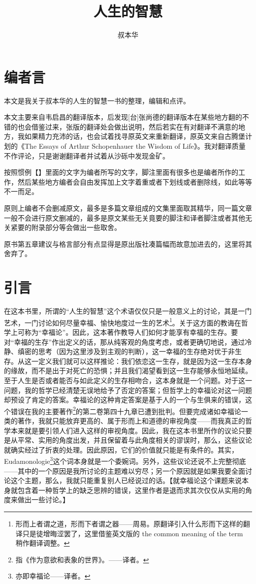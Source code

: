 \documentclass[12pt,oneside]{book}
\title{人生的智慧}
\author{叔本华}
\begin{document}



\frontmatter 
{}
\chapter*{编者言}
本文是我关于叔本华的人生的智慧一书的整理，编辑和点评。

本文主要来自韦启昌的翻译版本，后发现[台]张尚德的翻译版本在某些地方翻的不错的也会借鉴过来，张版的翻译处会做出说明，然后若实在有对翻译不满意的地方，我如果精力充沛的话，也会试着找寻原英文来重新翻译，原英文来自古腾堡计划的《The Essays of Arthur Schopenhauer the Wisdom of Life》。我对翻译质量不作评论，只是谢谢翻译者并试着从沙砾中发现金矿。

按照惯例【】里面的文字为编者所写的文字，脚注里面有很多也是编者所作的工作，然后某些地方编者会自由发挥加上文字着重或者下划线或者删除线，如此等等不一而足。 

原则上编者不会删减原文，最多是多篇文章组成的文集里面取其精华，同一篇文章一般不会进行原文删减的，最多是原文某些无关竟要的脚注和译者脚注或者其他无关紧要的附录部分等会做出一些取舍。

原书第五章建议与格言部分有点显得是原出版社凑篇幅而故意加进去的，这里将其舍弃了。

\chapter*{引言}
在这本书里，所谓的“人生的智慧”这个术语仅仅只是一般意义上的讨论，其是一门艺术，一门讨论如何尽量幸福、愉快地度过一生的艺术\footnote{形而上者谓之道，形而下者谓之器——周易。原翻译引入什么形而下这样的翻译只是徒增晦涩罢了，这里借鉴英文版的 the common meaning of the term 稍作翻译调整。}。关于这方面的教诲在哲学上可称为“幸福论”。因此，这本著作教导人们如何才能享有幸福的生存。要对“幸福的生存”作出定义的话，那从纯客观的角度考虑，或者更确切地说，通过冷静、缜密的思考（因为这里涉及到主观的判断），这一幸福的生存绝对优于非生存。从这一定义我们就可以这样推论：我们依恋这一生存，就是因为这一生存本身的缘故，而不是出于对死亡的恐惧；并且我们渴望看到这一生存能够永恒地延续。至于人生是否或者能否与如此定义的生存相吻合，这本身就是一个问题。对于这一问题，我的哲学已经清楚无误地给予了否定的答案；但哲学上的幸福论对这一问题却预设了肯定的答案。幸福论的这种肯定答案是基于人的一个与生俱来的错误，这个错误在我的主要著作\footnote{指《作为意欲和表象的世界》。——译者。}的第二卷第四十九章已遭到批判。但要完成诸如幸福论一类的著作，我就只能放弃更高的、属于形而上和道德的审视角度——而我真正的哲学本来就是要引领人们进入这样的审视角度。因此，我在这本书里所作的议论只要是从平常、实用的角度出发，并且保留着与此角度相关的谬误时，那么，这些议论就确实经过了折衷的处理。因此原因，它们的价值就只能是有条件的。其实，Eudamonologie\footnote{亦即幸福论——译者。}这个词本身就是一个委婉词。另外，这些议论还说不上完整彻底——其中的一个原因是我所讨论的主题难以穷尽；另一个原因就是如果我要全面讨论这个主题，那么，我就只能重复别人已经说过的话。【就幸福论这个课题来说本身就包含着一种哲学上的缺乏思辨的错误，这里作者是退而求其次仅仅从实用的角度来做出一些讨论。】 
\end{document}
